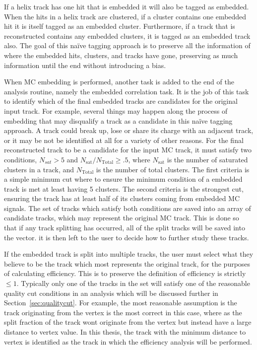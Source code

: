  If a helix track has one hit that is embedded it will also be tagged as embedded. When the hits in a helix track are clustered, if a cluster contains one embedded hit it is itself tagged as an embedded cluster. Furthermore, if a track that is reconstructed contains any embedded clusters, it is tagged as an embedded track also. The goal of this na\"ive tagging approach is to preserve all the information of where the embedded hits, clusters, and tracks have gone, preserving as much information until the end without introducing a bias.
 
  When MC embedding is performed, another task is added to the end of the analysis routine, namely the embedded correlation task. It is the job of this task to identify which of the final embedded tracks are candidates for the original input track. For example, several things may happen along the process of embedding that may disqualify a track as a candidate in this na\"ive tagging approach. A track could break up, lose or share its charge with an adjacent track, or it may be not be identified at all for a variety of other reasons. For the final reconstructed track to be a candidate for the input MC track, it must satisfy two conditions, $N_{sat} > 5$ and $N_{\mathrm{sat}}/N_{\mathrm{Total}} \geq .5$, where $N_{\mathrm{sat}}$ is the number of saturated clusters in a track, and $N_{\mathrm{Total}}$ is the number of total clusters. The first criteria is a simple minimum cut where to ensure the minimum condition of a embedded track is met at least having 5 clusters. The second criteria is the strongest cut, ensuring the track has at least half of its clusters coming from embedded MC signals. The set of tracks which satisfy both conditions are saved into an array of candidate tracks, which may represent the original MC track. This is done so that if any track splitting has occurred, all of the split tracks will be saved into the vector. it is then left to the user to decide how to further study these tracks. 

If the embedded track is split into multiple tracks, the user must select what they believe to be the track which most represents the original track, for the purposes of calculating efficiency. This is to preserve the definition of efficiency is strictly $\leq 1$. Typically only one of the tracks in the set will satisfy one of the reasonable quality cut conditions in an analysis which will be discussed further in Section~\ref{sec:qualitycut}. For example, the most reasonable assumption is the track originating from the vertex is the most correct in this case, where as the split fraction of the track wont originate from the vertex but instead have a large distance to vertex value. In this thesis, the track with the minimum distance to vertex is identified as the track in which the efficiency analysis will be performed.



